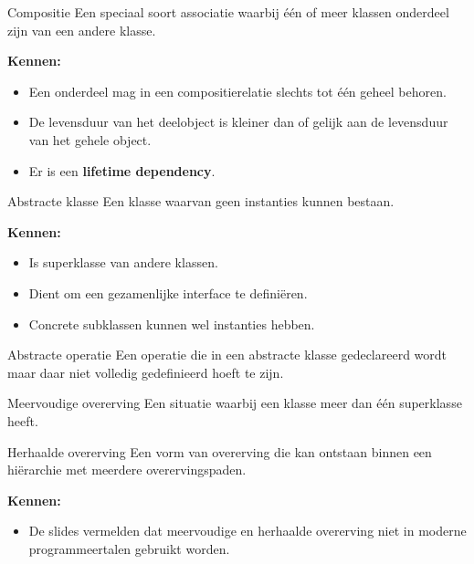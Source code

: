 \documentclass[11pt,a4paper]{article}
\begin{document}
\begin{definition}{Compositie}
Een speciaal soort associatie waarbij één of meer klassen onderdeel zijn van een andere klasse.

\textbf{Kennen:}
\begin{itemize}
    \item Een onderdeel mag in een compositierelatie slechts tot één geheel behoren.
    \item De levensduur van het deelobject is kleiner dan of gelijk aan de levensduur van het gehele object.
    \item Er is een \textbf{lifetime dependency}.
\end{itemize}
\end{definition}

\begin{definition}{Abstracte klasse}
Een klasse waarvan geen instanties kunnen bestaan.

\textbf{Kennen:}
\begin{itemize}
    \item Is superklasse van andere klassen.
    \item Dient om een gezamenlijke interface te definiëren.
    \item Concrete subklassen kunnen wel instanties hebben.
\end{itemize}
\end{definition}

\begin{definition}{Abstracte operatie}
Een operatie die in een abstracte klasse gedeclareerd wordt maar daar niet volledig gedefinieerd hoeft te zijn.
\end{definition}

\begin{definition}{Meervoudige overerving}
Een situatie waarbij een klasse meer dan één superklasse heeft.
\end{definition}

\begin{definition}{Herhaalde overerving}
Een vorm van overerving die kan ontstaan binnen een hiërarchie met meerdere overervingspaden.

\textbf{Kennen:}
\begin{itemize}
    \item De slides vermelden dat meervoudige en herhaalde overerving niet in moderne programmeertalen gebruikt worden.
\end{itemize}
\end{definition}
\end{document}
